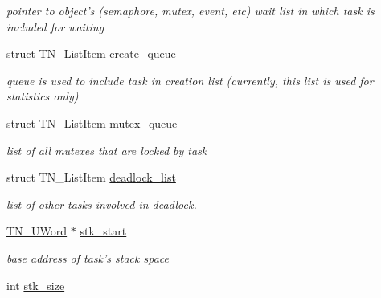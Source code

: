 \begin{DoxyCompactItemize}
\begin{DoxyCompactList}\small\item\em pointer to object's (semaphore, mutex, event, etc) wait list in which task is included for waiting \end{DoxyCompactList}\item 
\hypertarget{structTN__Task_aedb23df723d259530f10a122fec42334}{struct T\+N\+\_\+\+List\+Item \hyperlink{structTN__Task_aedb23df723d259530f10a122fec42334}{create\+\_\+queue}}\label{structTN__Task_aedb23df723d259530f10a122fec42334}

\begin{DoxyCompactList}\small\item\em queue is used to include task in creation list (currently, this list is used for statistics only) \end{DoxyCompactList}\item 
\hypertarget{structTN__Task_ad4decd7355c95a5b60a6774c3ee19eb9}{struct T\+N\+\_\+\+List\+Item \hyperlink{structTN__Task_ad4decd7355c95a5b60a6774c3ee19eb9}{mutex\+\_\+queue}}\label{structTN__Task_ad4decd7355c95a5b60a6774c3ee19eb9}

\begin{DoxyCompactList}\small\item\em list of all mutexes that are locked by task \end{DoxyCompactList}\item 
struct T\+N\+\_\+\+List\+Item \hyperlink{structTN__Task_a097e79851e01fb3c73f0346d99ea8b7e}{deadlock\+\_\+list}
\begin{DoxyCompactList}\small\item\em list of other tasks involved in deadlock. \end{DoxyCompactList}\item 
\hypertarget{structTN__Task_a6a110c830046d9a10c6a72e659dce3c3}{\hyperlink{tn__arch__example_8h_ab80cba0fe9ffcd9011d53dfeb9e39bf4}{T\+N\+\_\+\+U\+Word} $\ast$ \hyperlink{structTN__Task_a6a110c830046d9a10c6a72e659dce3c3}{stk\+\_\+start}}\label{structTN__Task_a6a110c830046d9a10c6a72e659dce3c3}

\begin{DoxyCompactList}\small\item\em base address of task's stack space \end{DoxyCompactList}\item 
\hypertarget{structTN__Task_a462664666a4189baa549efcf9d4562ab}{int \hyperlink{structTN__Task_a462664666a4189baa549efcf9d4562ab}{stk\+\_\+size}}\label{structTN__Task_a462664666a4189baa549efcf9d4562ab}


\end{DoxyCompactItemize}
